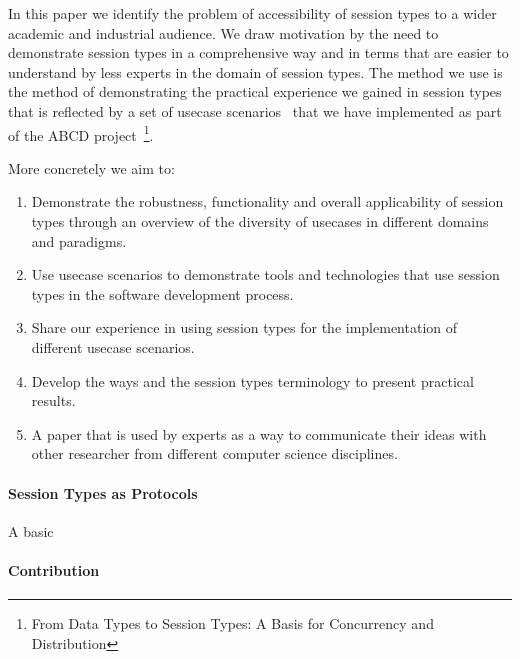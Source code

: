 In this paper we identify the problem of accessibility of session
types to a wider academic and industrial audience.
We draw motivation by the need to demonstrate session
types in a comprehensive way and in terms that are easier to
understand by less experts in the domain of session types.
The method we use is the method of demonstrating the practical
experience we gained in session types that is reflected by a set of
usecase scenarios~\cite{usecase_repository} that we have implemented as part of 
the ABCD project~\cite{ABCD}\footnote{From Data Types to Session Types:
A Basis for Concurrency and Distribution}.

More concretely we aim to:
%
\begin{enumerate}%
	\item	Demonstrate the robustness, functionality and overall applicability of session types
			through an overview of the diversity of usecases in different domains
			and paradigms.

	\item	Use usecase scenarios to demonstrate tools and technologies that
			use session types in the software development process.

	\item	Share our experience in using session types for the
			implementation of different usecase scenarios.

	\item	Develop the ways and the session types terminology to
			present practical results.

	\item	A paper that is used by experts as a way to communicate
			their ideas with other researcher from different computer
			science disciplines.
\end{enumerate}

\paragraph{Session Types as Protocols}
A basic 

\paragraph{Contribution}



